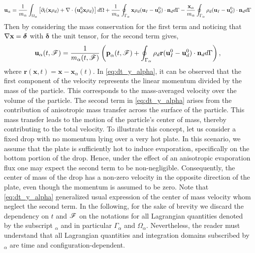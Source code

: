\begin{equation}
    \textbf{u}_\alpha = 
    \frac{1}{m_\alpha}\int_{\Omega_{\alpha}}  \left[
        \partial_t (\textbf{x}\rho_d ) + \mathbf{\nabla}\cdot\left(\textbf{u}_d^0 \textbf{x} \rho_d\right) 
    \right] d\Omega \\
    + \frac{1}{m_\alpha}\oint_{\Gamma_{\alpha}}  \textbf{x} \rho_d(\textbf{u}_I   - \textbf{u}_d^0) \cdot \textbf{n}_d  d\Gamma
    -  \frac{\textbf{x}_\alpha}{m_\alpha}    \oint_{\Gamma_{\alpha}}  \rho_d(\textbf{u}_I   - \textbf{u}_d^0) \cdot \textbf{n}_d  d\Gamma
\end{equation}
Then by considering the mass conservation for the first term and noticing that $\mathbf{\nabla} \textbf{x} = \bm\delta$ with $\bm\delta$ the unit tensor, for the second term gives, 
\begin{equation}
    \textbf{u}_\alpha(t,\mathscr{F}) = \frac{1}{m_\alpha(t,\mathscr{F})} \left(
        \textbf{p}_\alpha(t,\mathscr{F})
        +  \oint_{\Gamma_{\alpha}} \rho_d \textbf{r} (\textbf{u}_I^0 - \textbf{u}_d^0)\cdot \textbf{n}_d  d\Gamma
        \right),
        \label{eq:dt_y_alpha}
\end{equation}
where $\textbf{r}(\textbf{x},t) = \textbf{x} - \textbf{x}_\alpha(t)$. 
In \ref{eq:dt_y_alpha}, it can be observed that the first component of the velocity represents the linear momentum divided by the mass of the particle. 
This corresponds to the mass-averaged velocity over the volume of the particle.
The second term in \ref{eq:dt_y_alpha} arises from the contribution of anisotropic mass transfer across the surface of the particle. 
This mass transfer leads to the motion of the particle's center of mass, thereby contributing to the total velocity.
To illustrate this concept, let us consider a fixed drop with no momentum lying over a very hot plate.
In this scenario, we assume that the plate is sufficiently hot to induce evaporation, specifically on the bottom portion of the drop.
Hence, under the effect of an anisotropic evaporation flux one may expect the second term to be non-negligible.
Consequently, the center of mass of the drop has a non-zero velocity in the opposite direction of the plate, even though the momentum is assumed to be zero.
Note that \ref{eq:dt_y_alpha} generalized usual expression of the center of mass velocity whom neglect the second term.
In the following, for the sake of brevity we discard the dependency on $t$ and $\mathscr{F}$ on the notations for all Lagrangian quantities denoted by the subscript $_\alpha$ and in particular $\Gamma_\alpha$ and $\Omega_\alpha$.
Nevertheless, the reader must understand that all Lagrangian quantities and integration domains subscribed by $_\alpha$ are time and configuration-dependent. 

